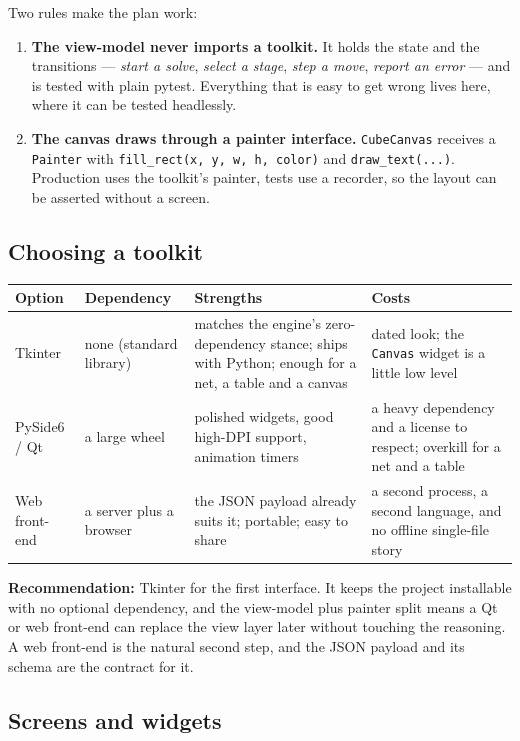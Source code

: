 Two rules make the plan work:

\begin{enumerate}[leftmargin=1.4em]
  \item \textbf{The view-model never imports a toolkit.}  It holds the state and the
  transitions --- \emph{start a solve}, \emph{select a stage}, \emph{step a move},
  \emph{report an error} --- and is tested with plain pytest.  Everything that is
  easy to get wrong lives here, where it can be tested headlessly.
  \item \textbf{The canvas draws through a painter interface.}  \texttt{CubeCanvas}
  receives a \texttt{Painter} with \texttt{fill\_rect(x, y, w, h, color)} and
  \texttt{draw\_text(...)}.  Production uses the toolkit's painter, tests use a
  recorder, so the layout can be asserted without a screen.
\end{enumerate}

\subsection{Choosing a toolkit}

\begin{longtable}{@{}p{3cm}p{2.4cm}p{4.2cm}p{4.4cm}@{}}
\toprule
Option & Dependency & Strengths & Costs \\
\midrule
\endhead
Tkinter & none (standard library) & matches the engine's zero-dependency stance;
ships with Python; enough for a net, a table and a canvas & dated look; the
\texttt{Canvas} widget is a little low level \\
PySide6 / Qt & a large wheel & polished widgets, good high-DPI support, animation
timers & a heavy dependency and a license to respect; overkill for a net and a
table \\
Web front-end & a server plus a browser & the JSON payload already suits it;
portable; easy to share & a second process, a second language, and no offline
single-file story \\
\bottomrule
\end{longtable}

\textbf{Recommendation:} Tkinter for the first interface.  It keeps the project
installable with no optional dependency, and the view-model plus painter split means
a Qt or web front-end can replace the view layer later without touching the
reasoning.  A web front-end is the natural second step, and the JSON payload and its
schema are the contract for it.

\subsection{Screens and widgets}


